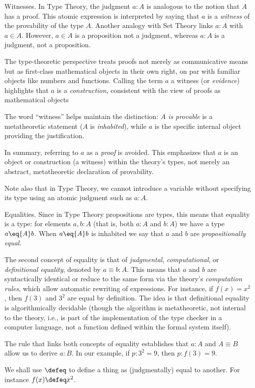 \begin{lpar}{Witnesses.}\label{lpar:witnesses}
    In Type Theory, the judgment $a\colon A$ is analogous to the notion that $A$ has a proof. This atomic expression is interpreted by saying that $a$ is a \textsl{witness} of the provability of the type $A$. Another analogy with Set Theory links $a\colon A$ with $a\in A$. However, $a\in A$ is a proposition not a judgment, whereas $a\colon A$ is a judgment, not a proposition.

    The type-theoretic perspective treats proofs not merely as communicative means but as first-class mathematical objects in their own right, on par with familiar objects like numbers and functions. Calling the term $a$ a witness (or \textsl{evidence}) highlights that $a$ is a \textit{construction}, consistent with the view of proofs as mathematical objects
    
    The word ``witness'' helps maintain the distinction: \textit{$A$ is provable} is a metatheoretic statement ($A$ is \textsl{inhabited}), while $a$ is the specific internal object providing the justification.
    
    In summary, referring to $a$ as a \textit{proof} is avoided. This emphasizes that $a$ is an object or construction (a witness) within the theory's types, not merely an abstract, metatheoretic declaration of provability.
    
    Note also that in Type Theory, we cannot introduce a variable without specifying its type using an atomic judgment such as $a\colon A$.
\end{lpar}

\begin{lpar}{Equalities.}
    Since in Type Theory propositions are types, this means that equality is a type: for elements $a, b\colon A$ (that is, both $a\colon A$ and $b\colon A$) we have a type $a\eq{A} b$. When $a\eq{A} b$ is inhabited we say that $a$ and $b$ are \textsl{propositionally equal}.

    The second concept of equality is that of \textsl{judgmental}, \textsl{computational}, or \textsl{definitional equality}, denoted by $a\equiv b\colon A$. This means that $a$ and $b$ are syntactically identical or reduce to the same form via the theory's \textsl{computation rules}, which allow automatic rewriting of expressions. For instance, if $f(x)=x^2$, then $f(3)$ and $3^2$ are equal by definition. The idea is that definitional equality is algorithmically decidable (though the algorithm is metatheoretic, not internal to the theory, i.e., is part of the implementation of the type checker in a computer language, not a function defined within the formal system itself).

    The rule that links both concepts of equality establishes that $a\colon A$ and $A\equiv B$ allow us to derive $a\colon B$. In our example, if $p\colon3^2=9$, then $p\colon f(3)=9$.

    We shall use $\defeq$ to define a thing as (judgmentally) equal to another. For instance $f(x)\defeq x^2$.
\end{lpar}

